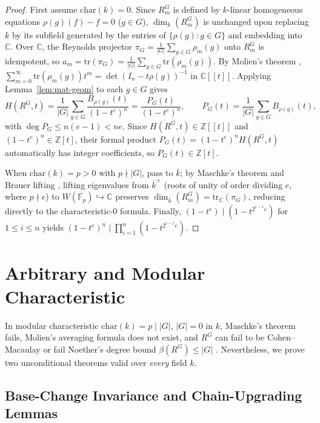 \documentclass[11pt]{article}
\theoremstyle{definition}
\theoremstyle{remark}
\begin{document}
\begin{proof}
First assume $\mathrm{char}(k) = 0$. Since $R_m^G$ is defined by $k$-linear homogeneous equations $\rho(g)(f) - f = 0$ ($g \in G$), $\dim_k(R_m^G)$ is unchanged upon replacing $k$ by its subfield generated by the entries of $\{\rho(g) : g \in G\}$ and embedding into $\mathbb{C}$. Over $\mathbb{C}$, the Reynolds projector $\pi_G = \frac{1}{|G|} \sum_{g \in G} \rho_m(g)$ onto $R_m^G$ is idempotent, so $a_m = \mathrm{tr}(\pi_G) = \frac{1}{|G|} \sum_{g \in G} \mathrm{tr}(\rho_m(g))$. By Molien's theorem \cite[Theorem~2.2.1]{Benson}, $\sum_{m=0}^{\infty} \mathrm{tr}(\rho_m(g)) t^m = \det(I_n - t\rho(g))^{-1}$ in $\mathbb{C}[[t]]$. Applying Lemma~\ref{lem:mat-geom} to each $g \in G$ gives
\[
H(R^G, t) = \frac{1}{|G|} \sum_{g \in G} \frac{B_{\rho(g)}(t)}{(1 - t^e)^n} = \frac{P_G(t)}{(1 - t^e)^n}, \qquad P_G(t) = \frac{1}{|G|} \sum_{g \in G} B_{\rho(g)}(t),
\]
with $\deg P_G \le n(e - 1) < ne$. Since $H(R^G, t) \in \mathbb{Z}[[t]]$ and $(1 - t^e)^n \in \mathbb{Z}[t]$, their formal product $P_G(t) = (1 - t^e)^n H(R^G, t)$ automatically has integer coefficients, so $P_G(t) \in \mathbb{Z}[t]$.

When $\mathrm{char}(k) = p > 0$ with $p \nmid |G|$, pass to $\overline{k}$; by Maschke's theorem and Brauer lifting \cite[Section~2.2]{Benson}, lifting eigenvalues from $\overline{k}^{\times}$ (roots of unity of order dividing $e$, where $p \nmid e$) to $W(\overline{\mathbb{F}_p}) \hookrightarrow \mathbb{C}$ preserves $\dim_{\overline{k}}(R_m^G) = \mathrm{tr}_{\mathbb{C}}(\pi_G)$, reducing directly to the characteristic-$0$ formula. Finally, $(1 - t^e) \mid (1 - t^{2^{i-1}e})$ for $1 \le i \le n$ yields $(1 - t^e)^n \mid \prod_{i=1}^n (1 - t^{2^{i-1}e})$.
\end{proof}

\section{Arbitrary and Modular Characteristic}

In modular characteristic $\mathrm{char}(k) = p \mid |G|$, $|G| = 0$ in $k$, Maschke's theorem fails, Molien's averaging formula does not exist, and $R^G$ can fail to be Cohen--Macaulay \cite{Bertin1967} or fail Noether's degree bound $\beta(R^G) \le |G|$ \cite{Richman1990}. Nevertheless, we prove two unconditional theorems valid over \emph{every} field $k$.

\subsection{Base-Change Invariance and Chain-Upgrading Lemmas}
\end{document}
